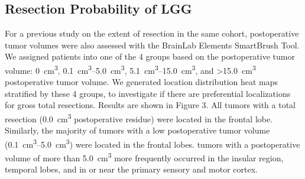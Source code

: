 \subsection{Resection Probability of LGG}
For a previous study on the extent of resection in the same cohort, postoperative \gls{tumor} volumes were also assessed with the BrainLab Elements SmartBrush Tool.
We assigned patients into one of the 4 groups based on the postoperative \gls{tumor} volume:  \SI{0}{\cubic\centi\metre}, \SIrange{0.1}{5.0}{\cubic\centi\metre}, \SIrange{5.1}{15.0}{\cubic\centi\metre}, and \SI{>15.0}{\cubic\centi\metre} postoperative \gls{tumor} volume.
We generated location distribution heat maps stratified by these 4 groups, to investigate if there are preferential localizations for gross total resections.
Results are shown in Figure 3.
All \glspl{tumor} with a total resection (\SI{0.0}{\cubic\centi\metre} postoperative residue) were located in the frontal lobe.
Similarly, the majority of \glspl{tumor} with a low postoperative \gls{tumor} volume (\SIrange{0.1}{5.0}{\cubic\centi\metre}) were located in the frontal lobes.
\Glspl{tumor} with a postoperative volume of more than \SI{5.0}{\cubic\centi\metre} more frequently occurred in the insular region, temporal lobes, and in or near the primary sensory and motor cortex.

